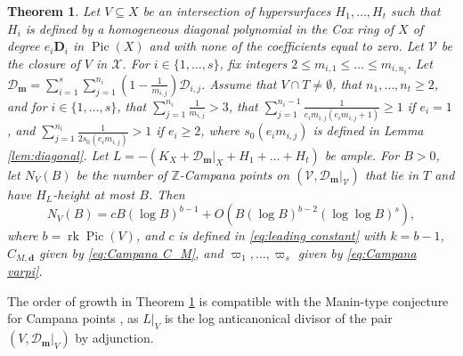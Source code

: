 \documentclass[10pt, a4paper, reqno, english]{amsart}
\newcommand\ZZ{\mathbb{Z}}
\newcommand\PP{\mathbb{P}} %
\newcommand{\divclass}{{\mathbf D}} %
\DeclareMathOperator{\pic}{Pic} %
\DeclareMathOperator{\rk}{rk} %
\newtheorem{theorem}{Theorem}
\theoremstyle{definition}
\numberwithin{theorem}{section}
\numberwithin{equation}{section}
\begin{document}
\begin{theorem}\label{thm:Campana}
Let $V\subseteq X$ be an intersection of hypersurfaces $H_1,\dots,H_t$ such that $H_i$ is defined by a homogeneous diagonal polynomial  in the Cox ring of $X$ of degree $e_i\divclass_i$ in $\pic(X)$ and with none of the coefficients equal to zero. 
Let $\mathscr V$ be the closure of $V$ in $\mathscr X$.
For $i\in\{1,\dots,s\}$, fix integers $2\leq m_{i,1}\leq \dots\leq m_{i,n_i}$. Let $\mathscr D_{\mathbf m}=\sum_{i=1}^s\sum_{j=1}^{n_i}(1-\frac 1{m_{i,j}})\mathscr D_{i,j}$.
 Assume that $V\cap T\neq\emptyset$, that $n_1,\dots,n_t\geq 2$, and for $i\in\{1,\dots,s\}$, that $\sum_{j=1}^{n_i}\frac 1{m_{i,j}}>3$, that $\sum_{j=1}^{n_i-1}\frac 1{e_im_{i,j}(e_im_{i,j}+1)}\geq 1$ if $e_i=1$,
 and $\sum_{j=1}^{n_i}\frac 1{2s_0(e_im_{i,j})}>1$ if $e_i\geq 2$, where $s_0(e_im_{i,j})$ is defined in Lemma \ref{lem:diagonal}.
Let $L=-(K_X+\mathscr D_{\mathbf m}|_X+H_1+\dots+H_t)$ be ample.
For $B>0$, let $N_V(B)$ be the number of $\ZZ$-Campana points on $(\mathscr V, \mathscr D_{\mathbf m}|_{\mathscr V})$ that lie in $T$ and have $H_L$-height at most $B$. Then 
$$
N_V(B)=cB(\log B)^{b-1} +O(B(\log B)^{b-2}(\log\log B)^s),
$$
where $b=\rk\pic(V)$, and $c$ is defined in \eqref{eq:leading constant} with $k=b-1$,  $C_{M,\mathbf d}$ given by \eqref{eq:Campana C_M},  and
$\varpi_1,\dots,\varpi_s$ given by \eqref{eq:Campana varpi}.
\end{theorem}

The order of growth in Theorem \ref{thm:Campana} is compatible with the Manin-type conjecture for Campana points \cite{PSTVA}, as $L|_V$ is the log anticanonical divisor of the pair $(V,\mathscr D_{\mathbf m}|_V)$ by adjunction.

\end{document}
